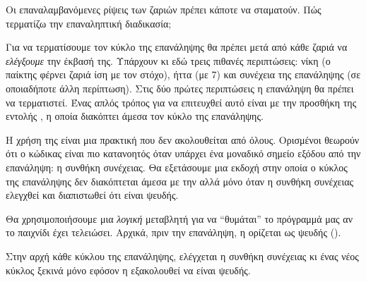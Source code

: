 \documentclass[a4paper,11pt,oneside]{book}
\begin{document}
\begin{question}
Οι επαναλαμβανόμενες ρίψεις των ζαριών πρέπει κάποτε να σταματούν. Πώς τερματίζω την επαναληπτική διαδικασία;
\end{question}

Για να τερματίσουμε τον κύκλο της επανάληψης θα πρέπει μετά από κάθε ζαριά να \emph{ελέγξουμε} την έκβασή της. Υπάρχουν κι εδώ τρεις πιθανές περιπτώσεις: νίκη (ο παίκτης φέρνει ζαριά ίση με τον στόχο), ήττα (με 7) και συνέχεια της επανάληψης (σε οποιαδήποτε άλλη περίπτωση). Στις δύο πρώτες περιπτώσεις η επανάληψη θα πρέπει να τερματιστεί. Ένας απλός τρόπος για να επιτευχθεί αυτό είναι με την προσθήκη της εντολής , η οποία διακόπτει άμεσα τον κύκλο της επανάληψης.

\clearpage

Η χρήση της  είναι μια πρακτική που δεν ακολουθείται από όλους. Ορισμένοι θεωρούν ότι ο κώδικας είναι πιο κατανοητός όταν υπάρχει ένα μοναδικό σημείο εξόδου από την επανάληψη: η συνθήκη συνέχειας. Θα εξετάσουμε μια εκδοχή στην οποία ο κύκλος της επανάληψης δεν διακόπτεται άμεσα με την  αλλά μόνο όταν η συνθήκη συνέχειας ελεγχθεί και διαπιστωθεί ότι είναι ψευδής.


Θα χρησιμοποιήσουμε μια \emph{λογική} %
μεταβλητή  για να ``θυμάται'' το πρόγραμμά μας αν το παιχνίδι έχει τελειώσει. Αρχικά, πριν την επανάληψη, η  ορίζεται ως ψευδής ().


Στην αρχή κάθε κύκλου της επανάληψης, ελέγχεται η συνθήκη συνέχειας  κι ένας νέος κύκλος ξεκινά μόνο εφόσον η  εξακολουθεί να είναι ψευδής.
\end{document}
